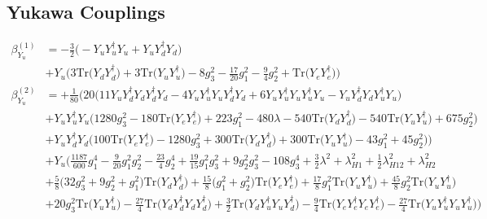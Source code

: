 \subsection{Yukawa Couplings}
{\allowdisplaybreaks  \begin{align} 
\beta_{Y_u}^{(1)} & =  
-\frac{3}{2} \Big(- {Y_u  Y_{u}^{\dagger}  Y_u}  + {Y_u  Y_{d}^{\dagger}  Y_d}\Big)\nonumber \\ 
 &+Y_u \Big(3 \mbox{Tr}\Big({Y_d  Y_{d}^{\dagger}}\Big)  + 3 \mbox{Tr}\Big({Y_u  Y_{u}^{\dagger}}\Big)  -8 g_{3}^{2}  -\frac{17}{20} g_{1}^{2}  -\frac{9}{4} g_{2}^{2}  + \mbox{Tr}\Big({Y_e  Y_{e}^{\dagger}}\Big)\Big)\\ 
\beta_{Y_u}^{(2)} & =  
+\frac{1}{80} \Big(20 \Big(11 {Y_u  Y_{d}^{\dagger}  Y_d  Y_{d}^{\dagger}  Y_d}  -4 {Y_u  Y_{u}^{\dagger}  Y_u  Y_{d}^{\dagger}  Y_d}  + 6 {Y_u  Y_{u}^{\dagger}  Y_u  Y_{u}^{\dagger}  Y_u}  - {Y_u  Y_{d}^{\dagger}  Y_d  Y_{u}^{\dagger}  Y_u} \Big)\nonumber \\ 
 &+{Y_u  Y_{u}^{\dagger}  Y_u} \Big(1280 g_{3}^{2}  -180 \mbox{Tr}\Big({Y_e  Y_{e}^{\dagger}}\Big)  + 223 g_{1}^{2}  -480 \lambda  -540 \mbox{Tr}\Big({Y_d  Y_{d}^{\dagger}}\Big)  -540 \mbox{Tr}\Big({Y_u  Y_{u}^{\dagger}}\Big)  + 675 g_{2}^{2} \Big)\nonumber \\ 
 &+{Y_u  Y_{d}^{\dagger}  Y_d} \Big(100 \mbox{Tr}\Big({Y_e  Y_{e}^{\dagger}}\Big)  -1280 g_{3}^{2}  + 300 \mbox{Tr}\Big({Y_d  Y_{d}^{\dagger}}\Big)  + 300 \mbox{Tr}\Big({Y_u  Y_{u}^{\dagger}}\Big)  -43 g_{1}^{2}  + 45 g_{2}^{2} \Big)\Big)\nonumber \\ 
 &+Y_u \Big(\frac{1187}{600} g_{1}^{4} -\frac{9}{20} g_{1}^{2} g_{2}^{2} -\frac{23}{4} g_{2}^{4} +\frac{19}{15} g_{1}^{2} g_{3}^{2} +9 g_{2}^{2} g_{3}^{2} -108 g_{3}^{4} +\frac{3}{2} \lambda^{2} +\lambda_{H1}^{2}+\frac{1}{2} \lambda_{H12}^{2} +\lambda_{H2}^{2}\nonumber \\ 
 &+\frac{5}{8} \Big(32 g_{3}^{2}  + 9 g_{2}^{2}  + g_{1}^{2}\Big)\mbox{Tr}\Big({Y_d  Y_{d}^{\dagger}}\Big) +\frac{15}{8} \Big(g_{1}^{2} + g_{2}^{2}\Big)\mbox{Tr}\Big({Y_e  Y_{e}^{\dagger}}\Big) +\frac{17}{8} g_{1}^{2} \mbox{Tr}\Big({Y_u  Y_{u}^{\dagger}}\Big) +\frac{45}{8} g_{2}^{2} \mbox{Tr}\Big({Y_u  Y_{u}^{\dagger}}\Big) \nonumber \\ 
 &+20 g_{3}^{2} \mbox{Tr}\Big({Y_u  Y_{u}^{\dagger}}\Big) -\frac{27}{4} \mbox{Tr}\Big({Y_d  Y_{d}^{\dagger}  Y_d  Y_{d}^{\dagger}}\Big) +\frac{3}{2} \mbox{Tr}\Big({Y_d  Y_{u}^{\dagger}  Y_u  Y_{d}^{\dagger}}\Big) -\frac{9}{4} \mbox{Tr}\Big({Y_e  Y_{e}^{\dagger}  Y_e  Y_{e}^{\dagger}}\Big) -\frac{27}{4} \mbox{Tr}\Big({Y_u  Y_{u}^{\dagger}  Y_u  Y_{u}^{\dagger}}\Big) \Big)\\ 

\end{align}}
